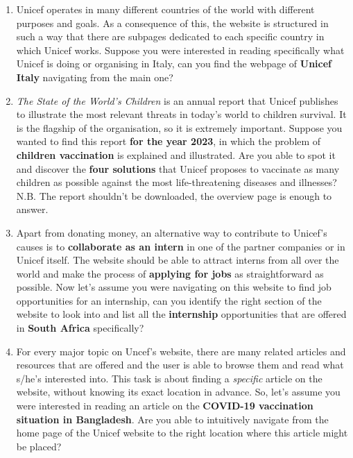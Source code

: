 \documentclass[11pt]{article}
\begin{document}
\begin{Form}
\begin{enumerate}
		\item Unicef operates in many different countries of the world with different purposes and goals. As a consequence of this, the website is structured in such a way that there are subpages dedicated to each specific country in which Unicef works. Suppose you were interested in reading specifically what Unicef is doing or organising in Italy, can you find the webpage of \textbf{Unicef Italy} navigating from the main one?
		
		\item \textit{The State of the World's Children} is an annual report that Unicef publishes to illustrate the most relevant threats in today's world to children survival. It is the flagship of the organisation, so it is extremely important. Suppose you wanted to find this report \textbf{for the year 2023}, in which the problem of \textbf{children vaccination} is explained and illustrated. Are you able to spot it and discover the \textbf{four solutions} that Unicef proposes to vaccinate as many children as possible against the most life-threatening diseases and illnesses?\\
		N.B. The report shouldn't be downloaded, the overview page is enough to answer.
		
		\item Apart from donating money, an alternative way to contribute to Unicef's causes is to \textbf{collaborate as an intern} in one of the partner companies or in Unicef itself. The website should be able to attract interns from all over the world and make the process of \textbf{applying for jobs} as straightforward as possible. Now let's assume you were navigating on this website to find job opportunities for an internship, can you identify the right section of the website to look into and list all the \textbf{internship} opportunities that are offered in \textbf{South Africa} specifically?
		
		\item For every major topic on Uncef's website, there are many related articles and resources that are offered and the user is able to browse them and read what s/he's interested into. This task is about finding a \textit{specific} article on the website, without knowing its exact location in advance. So, let's assume you were interested in reading an article on the\textbf{ COVID-19 vaccination situation in Bangladesh}. Are you able to intuitively navigate from the home page of the Unicef website to the right location where this article might be placed?
		
		
	\end{enumerate}
			

	
	\end{Form}
	
\end{document}
